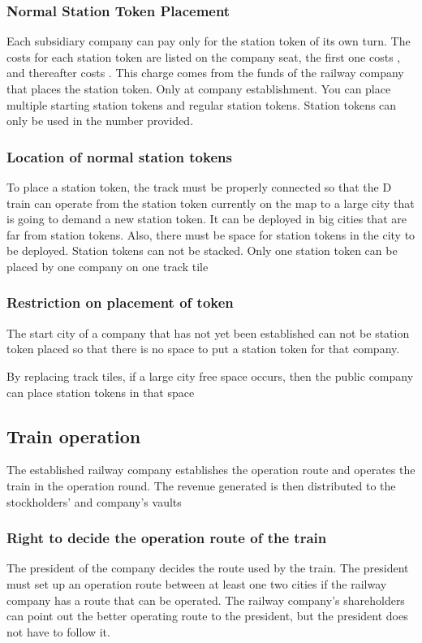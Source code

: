 \documentclass{article}
\begin{document}
\begin{CJK}{UTF8}{min}
\subsubsection{Normal Station Token Placement}
Each subsidiary company can pay only for the station token of its own
turn. The costs for each station token are listed on the company seat,
the first one costs , and thereafter costs . This charge
comes from the funds of the railway company that places the station
token. Only at company establishment. You can place multiple starting
station tokens and regular station tokens. Station tokens can only be
used in the number provided.

\subsubsection{Location of normal station tokens}
To place a station token, the track must be properly connected so that
the D train can operate from the station token currently on the map to
a large city that is going to demand a new station token. It can be
deployed in big cities that are far from station tokens. Also, there
must be space for station tokens in the city to be deployed. Station
tokens can not be stacked. Only one station token can be placed by one
company on one track tile

\subsubsection{Restriction on placement of token}
The start city of a company that has not yet been established can not
be station token placed so that there is no space to put a station
token for that company.

By replacing track tiles, if a large city free space occurs, then the
public company can place station tokens in that space

\subsection{Train operation}
The established railway company establishes the operation route and
operates the train in the operation round. The revenue generated is
then distributed to the stockholders' and company's vaults

\subsubsection{Right to decide the operation route of the train}
The president of the company decides the route used by the train. The
president must set up an operation route between at least one two
cities if the railway company has a route that can be operated. The
railway company's shareholders can point out the better operating
route to the president, but the president does not have to follow it.


\end{CJK}
\end{document}
